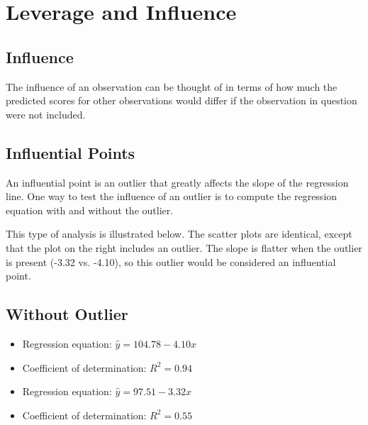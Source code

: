 \documentclass[residuals.tex]{subfiles}
\begin{document}
	\section{Leverage and Influence}
	\subsection{Influence}
	The influence of an observation can be thought of in terms of how much the predicted scores for other observations would differ if the observation in question were not included. 
	
	
	
	\subsection{Influential Points}
	
	An influential point is an outlier that greatly affects the slope of the regression line. One way to test the influence of an outlier is to compute the regression equation with and without the outlier.
	
	This type of analysis is illustrated below. The scatter plots are identical, except that the plot on the right includes an outlier. The slope is flatter when the outlier is present (-3.32 vs. -4.10), so this outlier would be considered an influential point.
	
	\subsection{Without Outlier}
	
	
	\begin{itemize}
		\item Regression equation: $\hat{y} = 104.78 - 4.10x$
		\item Coefficient of determination: $R^2 = 0.94$ 
	\end{itemize}
	\begin{itemize}
		\item Regression equation: $\hat{y} = 97.51 - 3.32x$
		\item Coefficient of determination: $R^2 = 0.55$ 
	\end{itemize}
	
\end{document}
